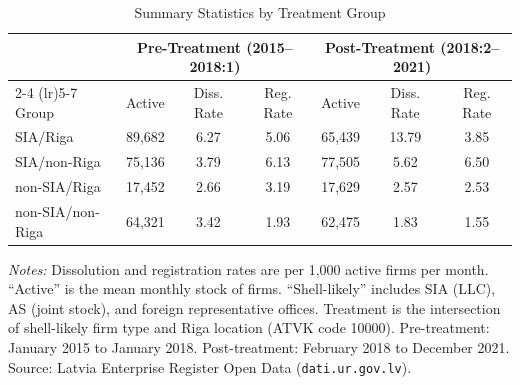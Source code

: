 \begin{table}[t]
\centering
\caption{Summary Statistics by Treatment Group}
\label{tab:summary}
\begin{tabular}{lcccccc}
\hline\hline
 & \multicolumn{3}{c}{Pre-Treatment (2015--2018:1)} & \multicolumn{3}{c}{Post-Treatment (2018:2--2021)} \\
\cmidrule(lr){2-4} \cmidrule(lr){5-7}
Group & Active & Diss. Rate & Reg. Rate & Active & Diss. Rate & Reg. Rate \\
\hline
SIA/Riga & 89,682 & 6.27 & 5.06 & 65,439 & 13.79 & 3.85 \\
SIA/non-Riga & 75,136 & 3.79 & 6.13 & 77,505 & 5.62 & 6.50 \\
non-SIA/Riga & 17,452 & 2.66 & 3.19 & 17,629 & 2.57 & 2.53 \\
non-SIA/non-Riga & 64,321 & 3.42 & 1.93 & 62,475 & 1.83 & 1.55 \\
\hline\hline
\end{tabular}
\begin{tablenotes}[flushleft]
\small
\item \textit{Notes:} Dissolution and registration rates are per 1,000 active firms per month. ``Active'' is the mean monthly stock of firms. ``Shell-likely'' includes SIA (LLC), AS (joint stock), and foreign representative offices. Treatment is the intersection of shell-likely firm type and Riga location (ATVK code 10000). Pre-treatment: January 2015 to January 2018. Post-treatment: February 2018 to December 2021. Source: Latvia Enterprise Register Open Data (\texttt{dati.ur.gov.lv}).
\end{tablenotes}
\end{table}

